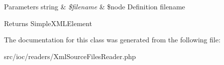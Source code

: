 \begin{DoxyParams}[1]{Parameters}
string & {\em \$filename} & \$node Definition filename \\
\hline
\end{DoxyParams}
\begin{DoxyReturn}{Returns}
Simple\-X\-M\-L\-Element 
\end{DoxyReturn}


The documentation for this class was generated from the following file\-:\begin{DoxyCompactItemize}
\item 
src/ioc/readers/Xml\-Source\-Files\-Reader.\-php\end{DoxyCompactItemize}
